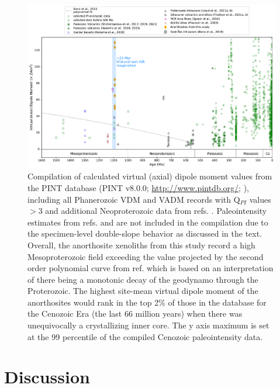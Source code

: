 \documentclass[9pt,twocolumn,twoside,lineno]{pnas-new}
\begin{document}
\begin{figure}[h!]
\noindent\includegraphics[width=17.8 cm]{PINT_compilation.pdf}
\centering
\caption{\footnotesize{Compilation of calculated virtual (axial) dipole moment values from the PINT database (PINT v8.0.0; \url{http://www.pintdb.org/}; \citealp{Bono2021a}), including all Phanerozoic VDM and VADM records with Q$_{PI}$ values $>$3 and additional Neoproterozoic data from refs. \citealp{Lloyd2021a, Lloyd2021b, Thallner2021a, Thallner2021b}. Paleointensity estimates from refs. \citealp{Pesonen1983a} and \citealp{Kulakov2013a} are not included in the compilation due to the specimen-level double-slope behavior as discussed in the text. Overall, the anorthosite xenoliths from this study record a high Mesoproterozoic field exceeding the value projected by the second order polynomial curve from ref. \citealp{Bono2019a} which is based on an interpretation of there being a monotonic decay of the geodynamo through the Proterozoic. The highest site-mean virtual dipole moment of the anorthosites would rank in the top 2$\%$ of those in the database for the Cenozoic Era (the last 66 million years) when there was unequivocally a crystallizing inner core. The y axis maximum is set at the 99 percentile of the compiled Cenozoic paleointensity data.}}
\label{fig:PINT_compilation}
\end{figure}

\section*{Discussion}
\end{document}
